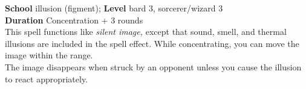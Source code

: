 \textbf{School} illusion (figment); \textbf{Level} bard 3, sorcerer/wizard 3\\
\textbf{Duration} Concentration + 3 rounds\\
This spell functions like \textit{silent image, }except that sound, smell, and thermal illusions are included in the spell effect. While concentrating, you can move the image within the range. \\
The image disappears when struck by an opponent unless you cause the illusion to react appropriately.\\

